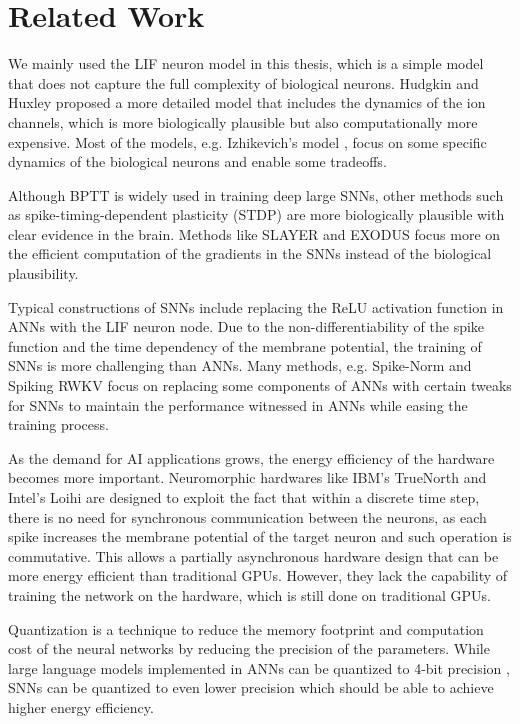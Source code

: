\chapter{Related Work}
\label{chap:related}

We mainly used the LIF neuron model \cite{lapicque1907louis} in this thesis, which is a simple model that does not capture the full complexity of biological neurons. Hudgkin and Huxley \cite{jphysiol.1952.sp004764} proposed a more detailed model that includes the dynamics of the ion channels, which is more biologically plausible but also computationally more expensive. Most of the models, e.g. Izhikevich's model \cite{1257420}, focus on some specific dynamics of the biological neurons and enable some tradeoffs. 

Although BPTT is widely used in training deep large SNNs, other methods such as spike-timing-dependent plasticity (STDP) \cite{doi:10.1126/science.275.5297.213} are more biologically plausible with clear evidence in the brain. Methods like SLAYER \cite{Shrestha2018} and EXODUS \cite{bauer2022exodus} focus more on the efficient computation of the gradients in the SNNs instead of the biological plausibility.

Typical constructions of SNNs include replacing the ReLU activation function in ANNs with the LIF neuron node. Due to the non-differentiability of the spike function and the time dependency of the membrane potential, the training of SNNs is more challenging than ANNs. Many methods, e.g. Spike-Norm \cite{10.3389/fnins.2019.00095} and Spiking RWKV \cite{zhu2024spikegptgenerativepretrainedlanguage} focus on replacing some components of ANNs with certain tweaks for SNNs to maintain the performance witnessed in ANNs while easing the training process.

As the demand for AI applications grows, the energy efficiency of the hardware becomes more important. Neuromorphic hardwares like IBM's TrueNorth \cite{7229264} and Intel's Loihi \cite{8259423} are designed to exploit the fact that within a discrete time step, there is no need for synchronous communication between the neurons, as each spike increases the membrane potential of the target neuron and such operation is commutative. This allows a partially asynchronous hardware design that can be more energy efficient than traditional GPUs. 
However, they lack the capability of training the network on the hardware, which is still done on traditional GPUs.

Quantization is a technique to reduce the memory footprint and computation cost of the neural networks by reducing the precision of the parameters. While large language models implemented in ANNs can be quantized to 4-bit precision \cite{ashkboos2024quarotoutlierfree4bitinference}, SNNs can be quantized to even lower precision \cite{10.1145/3664647.3681186} which should be able to achieve higher energy efficiency.

